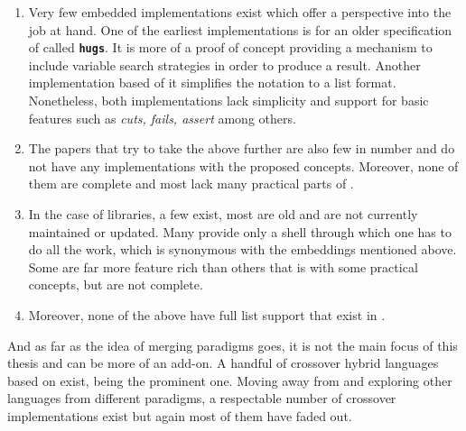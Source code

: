 \documentclass[thesis-solanki.tex]{subfiles}
\begin{document}
\begin{enumerate}
\item Very few embedded implementations exist which offer a perspective into the job at hand. One of the earliest implementations
\cite{website:mini-prolog-hugs98} is for an older specification of  called 
\texttt{\bfseries{hugs}}. It is more of a proof of concept providing a mechanism to include variable search strategies in order to produce
a result. Another implementation \cite{website:takashi-workplace} based of it simplifies the notation to a list format. Nonetheless, both
implementations lack simplicity and support for basic  features such as \textit{cuts, fails, assert} among others.

\begin{comment}
\item Only two embeddings exist, one of them is old and made for \texttt{\bfseries{hugs}} a functional programming system based on the
\progLang{Haskell 98} specification. It is complex and also lacks a lot of \progLang{Prolog} like features including \textit{cuts, fails,
assert} among others. The second one is based off the first one to make it simple but it loses the variable search strategy support which
allows the programmer to choose the manner in which a solution is produced.
\end{comment}

\item The papers that try to take the above further are also few in number and do not have any implementations with the proposed
concepts. Moreover, none of them are complete and most lack many practical parts of .

\item In the case of libraries, a few exist, most are old and are not currently maintained or updated. Many provide only a shell through which one has to do all the work,
which is synonymous with the embeddings mentioned above. Some are far more feature rich than others that is with some practical 
concepts, but are not complete.

\item Moreover, none of the above have full list support that exist in .
\end{enumerate}

And as far as the idea of merging paradigms goes, it is not the main focus of this thesis and can be more of an
add-on.
A handful of crossover hybrid languages based on  exist,  \cite{website:curry}
being the prominent one.
Moving away from  and exploring other languages from different paradigms, a respectable number of
crossover implementations exist but again most of them have faded out.
\end{document}
